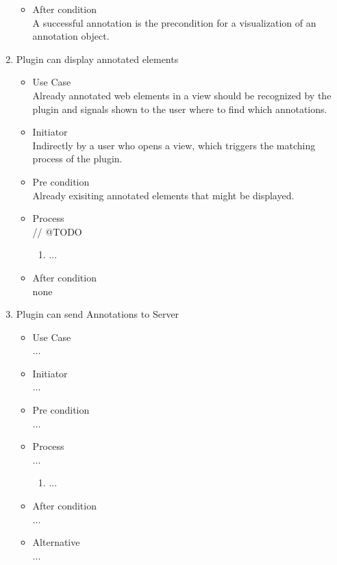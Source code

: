 \begin{enumerate}[UseC. A.]
\begin{itemize}
	\item After condition \\ 
A successful annotation is the precondition for a visualization of an annotation object.
\end{itemize}

\item {Plugin can display annotated elements}
\begin{itemize}
	\item Use Case \\
Already annotated web elements in a view should be recognized by the plugin and signals shown to the user where to find which annotations.
	\item Initiator \\
Indirectly by a user who opens a view, which triggers the matching process of the plugin.
	\item Pre condition \\ 
Already exisiting annotated elements that might be displayed. 
	\item Process \\
// @TODO \\
	\begin{enumerate}
		\item ...
	\end{enumerate}
	
	\item After condition \\ 
none
\end{itemize}

\item {Plugin can send Annotations to Server}
\begin{itemize}
	\item Use Case \\
...
	\item Initiator \\
...
	\item Pre condition \\ 
...
	\item Process \\
...
	\begin{enumerate}
		\item ...
	\end{enumerate}
	
	\item After condition \\ 
...
	\item Alternative \\ 
...	
\end{itemize}


\end{enumerate}
